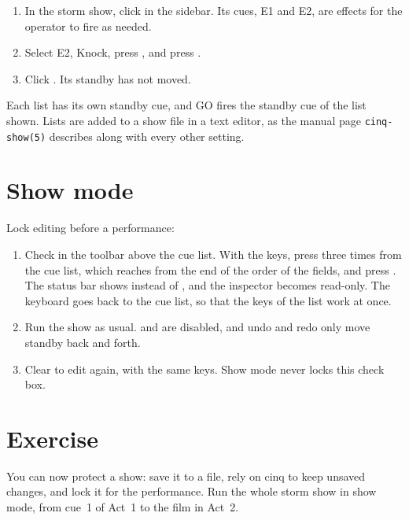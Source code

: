 \begin{enumerate}
\item In the storm show, click  in the sidebar.  Its cues, E1
  and E2, are effects for the operator to fire as needed.
\item Select E2, Knock, press , and press \@.
\item Click .  Its standby has not moved.
\end{enumerate}

Each list has its own standby cue, and GO fires the standby cue of the list
shown.  Lists are added to a show file in a text editor, as the manual page
\texttt{cinq-show(5)} describes along with every other setting.

\section{Show mode}

Lock editing before a performance:

\begin{enumerate}
\item Check  in the toolbar above the cue list.  With the keys,
  press  three times from the cue list, which reaches
   from the end of the order of the fields, and press
  .  The status bar shows  instead of , and the inspector becomes read-only.  The keyboard goes back to the
  cue list, so that the keys of the list work at once.
\item Run the show as usual.   and  are disabled,
  and undo and redo only move standby back and forth.
\item Clear  to edit again, with the same keys.  Show mode never
  locks this check box.
\end{enumerate}

\section*{Exercise}

You can now protect a show: save it to a file, rely on cinq to keep unsaved
changes, and lock it for the performance.  Run the whole storm show in show
mode, from cue~1 of Act~1 to the film in Act~2.

